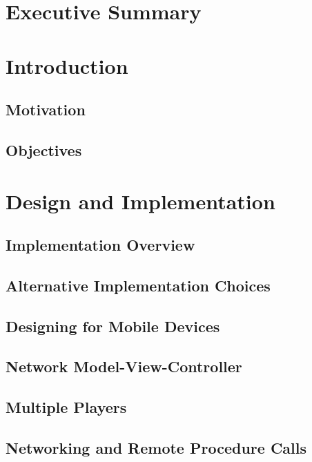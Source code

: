 \documentclass[12pt]{article} %
\begin{document}
\tableofcontents %

\newpage %

\section{Executive Summary}

\section{Introduction}
\subsection{Motivation}
\subsection{Objectives}

\section{Design and Implementation}
\subsection{Implementation Overview}
\subsection{Alternative Implementation Choices}
\subsection{Designing for Mobile Devices}
\subsection{Network Model-View-Controller}
\subsection{Multiple Players}
\subsection{Networking and Remote Procedure Calls}
\end{document}
